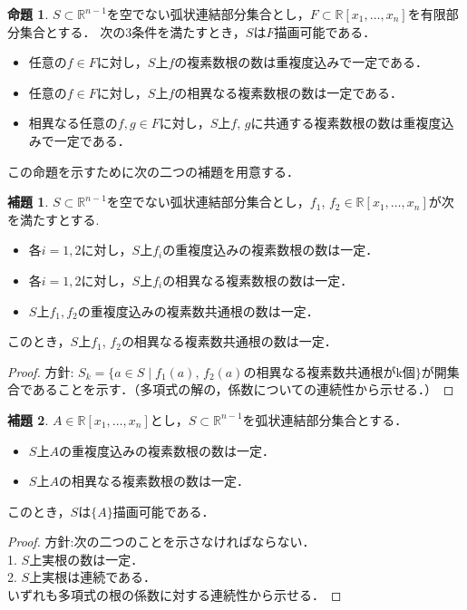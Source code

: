 \documentclass[uplatex, dvipdfmx]{jsarticle}
\newcommand{\R}{\mathbb{R}}
\theoremstyle{definition}
\newtheorem{proposition}{命題}[section]
\newtheorem{lemma}{補題}[section]
\begin{document}
\begin{proposition}\label{proposition:del}
$S \subset \R^{n-1}$を空でない弧状連結部分集合とし，$F \subset \R[x_1, \dots, x_n]$を有限部分集合とする．
次の3条件を満たすとき，$S$は$F$描画可能である．
\begin{itemize}
     \item 任意の$f \in F$に対し，$S$上$f$の複素数根の数は重複度込みで一定である．
     \item 任意の$f \in F$に対し，$S$上$f$の相異なる複素数根の数は一定である．
     \item 相異なる任意の$f, g \in F$に対し，$S$上$f$, $g$に共通する複素数根の数は重複度込みで一定である．
\end{itemize}
\end{proposition}

この命題を示すために次の二つの補題を用意する．

\begin{lemma}\label{lemma:del_1}
$S \subset \R^{n-1}$を空でない弧状連結部分集合とし，$f_1$, $f_2 \in \R[x_1, \dots, x_n]$が次を満たすとする.
\begin{itemize}
\item 各$i=1, 2$に対し，$S$上$f_i$の重複度込みの複素数根の数は一定．
\item 各$i=1, 2$に対し，$S$上$f_i$の相異なる複素数根の数は一定．
\item $S$上$f_1, f_2$の重複度込みの複素数共通根の数は一定．
\end{itemize}
このとき，$S$上$f_1$, $f_2$の相異なる複素数共通根の数は一定．
\end{lemma}
\begin{proof}
方針: $S_k = \{a \in S \mid \text{$f_1(a)$, $f_2(a)$の相異なる複素数共通根がk個} \}$が開集合であることを示す．（多項式の解の，係数についての連続性から示せる．）

\end{proof}

\begin{lemma}\label{lemma:del_2}
$A \in \R[x_1, \dots, x_n]$とし，$S \subset \R^{n-1}$を弧状連結部分集合とする．
\begin{itemize}
\item $S$上$A$の重複度込みの複素数根の数は一定．
\item $S$上$A$の相異なる複素数根の数は一定．
\end{itemize}
このとき，$S$は$\{A\}$描画可能である．
\end{lemma}

\begin{proof}
方針:次の二つのことを示さなければならない．\\
1.  $S$上実根の数は一定．\\
2.  $S$上実根は連続である．\\
いずれも多項式の根の係数に対する連続性から示せる．
\end{proof}
\end{document}
